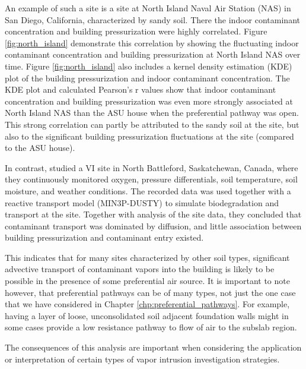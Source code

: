 An example of such a site is a site at North Island Naval Air Station (NAS) in San Diego, California, characterized by sandy soil.
There the indoor contaminant concentration and building pressurization were highly correlated\cite{hosangadi_high-frequency_2017}.
Figure \ref{fig:north_island} demonstrate this correlation by showing the fluctuating indoor contaminant concentration and building pressurization at North Island NAS over time.
Figure \ref{fig:north_island} also includes a kernel density estimation (KDE) plot of the building pressurization and indoor contaminant concentration.
The KDE plot and calculated Pearson's r values show that indoor contaminant concentration and building pressurization was even more strongly associated at North Island NAS than the ASU house when the preferential pathway was open.
This strong correlation can partly be attributed to the sandy soil at the site, but also to the significant building pressurization fluctuations at the site (compared to the ASU house).\par

In contrast, \citeauthor{hers_evaluation_2014}\cite{hers_evaluation_2014} studied a VI site in North Battleford, Saskatchewan, Canada, where they continuously monitored oxygen, pressure differentials, soil temperature, soil moisture, and weather conditions.
The recorded data was used together with a reactive transport model (MIN3P-DUSTY) to simulate biodegradation and transport at the site.
Together with analysis of the site data, they concluded that contaminant transport was dominated by diffusion, and little association between building pressurization and contaminant entry existed.\par

This indicates that for many sites characterized by other soil types, significant advective transport of contaminant vapors into the building is likely to be possible in the presence of some preferential air source.
It is important to note however, that preferential pathways can be of many types, not just the one case that we have considered in Chapter \ref{chp:preferential_pathways}.
For example, having a layer of loose, unconsolidated soil adjacent foundation walls might in some cases provide a low resistance pathway to flow of air to the subslab region.\par

The consequences of this analysis are important when considering the application or interpretation of certain types of vapor intrusion investigation strategies.\par
\clearpage
\newpage
